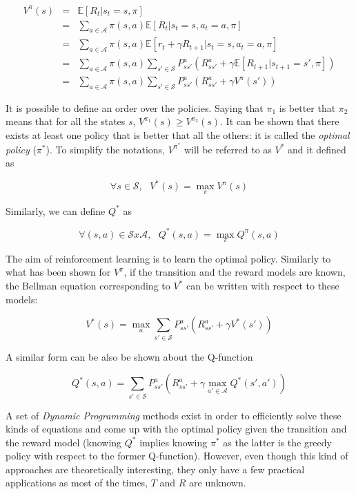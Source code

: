         \begin{eqnarray}
          	V^{\pi} (s)   & = & \mathbb{E} [R_t | s_t = s, \pi] \nonumber \\
           	& = & \sum_{a \in \mathcal{A}} \pi (s,a) \mathbb{E} [R_t | s_t = s, a_t = a, \pi] \nonumber \\
            & = & \sum_{a \in \mathcal{A}} \pi (s,a) \mathbb{E} [r_t + \gamma R_{t+1} | s_t = s, a_t = a, \pi] \nonumber \\
            & = & \sum_{a \in \mathcal{A}} \pi (s,a)  \sum_{s' \in \mathcal{S}} P_{ss'}^a (R_{ss'}^a + \gamma \mathbb{E} [R_{t+1} | s_{t+1} = s', \pi]) \nonumber \\
            & = & \sum_{a \in \mathcal{A}} \pi (s,a)  \sum_{s' \in \mathcal{S}} P_{ss'}^a (R_{ss'}^a + \gamma V^{\pi} (s')) \nonumber
        \end{eqnarray}
            
      	It is possible to define an order over the policies. Saying that $\pi_1$ is better that $\pi_2$ means that for all the states $s$, $V^{\pi_1} (s) \geq V^{\pi_2} (s)$. It can be shown that there exists at least one policy that is better that all the others: it is called the \textit{optimal policy} ($\pi^*$). To simplify the notations, $V^{\pi^*}$ will be referred to as $V^*$ and it defined as
        
        	$$ \forall s \in \mathcal{S}, \text{ } V^* (s) = \max_\pi V^\pi (s) $$
            
       	Similarly, we can define $Q^*$ as
        
        	$$ \forall (s,a) \in \mathcal{S}x\mathcal{A}, \text{ } Q^*(s,a) = \max_\pi Q^{\pi}(s,a) $$

        The aim of reinforcement learning is to learn the optimal policy. Similarly to what has been shown for $V^{\pi}$, if the transition and the reward models are known, the Bellman equation corresponding to $V^*$ can be written with respect to these models:

                $$ V^*(s) = \max_a \sum_{s' \in \mathcal{S}} P_{ss'}^a (R_{ss'}^a + \gamma V^*(s')) $$
        
        A similar form can be also be shown about the Q-function

                $$ Q^*(s,a) = \sum_{s' \in \mathcal{S}} P_{ss'}^a (R_{ss'}^a + \gamma \max_{a' \in \mathcal{A}} Q^*(s',a'))  $$

        A set of \textit{Dynamic Programming} methods exist in order to efficiently solve these kinds of equations and come up with the optimal policy given the transition and the reward model (knowing $Q^*$ implies knowing $\pi^*$ as the latter is the greedy policy with respect to the former Q-function). However, even though this kind of approaches are theoretically interesting, they only have a few practical applications as most of the times, $T$ and $R$ are unknown.

